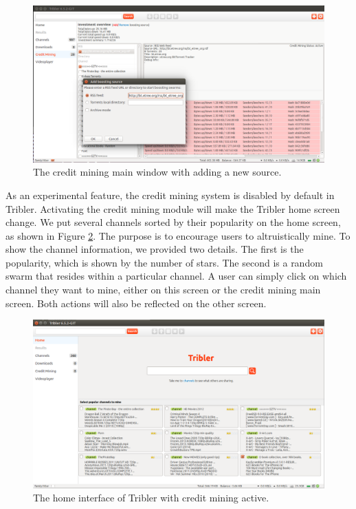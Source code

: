\begin{figure}[h!]
	\begin{adjustwidth}{-1.5cm}{-1cm}
			\centering
			\includegraphics[width=1.2\textwidth]{pics/overview_result.png}
			\caption{The credit mining main window with adding a new source.}
			\label{fig:overview}
		
	\end{adjustwidth}
\end{figure}

As an experimental feature, the credit mining system is disabled by default in Tribler. Activating the credit mining module will make the Tribler home screen change. We put several channels sorted by their popularity on the home screen, as shown in Figure \ref{fig:homecm}. The purpose is to encourage users to altruistically mine. To show the channel information, we provided two details. The first is the popularity, which is shown by the number of stars. The second is a random swarm that resides within a particular channel. A user can simply click on which channel they want to mine, either on this screen or the credit mining main screen. Both actions will also be reflected on the other screen. 

\begin{figure}[h]
	\includegraphics[width=\textwidth]{pics/home_channel.png}
	\caption{The home interface of Tribler with credit mining active.}
	\label{fig:homecm}
\end{figure}

